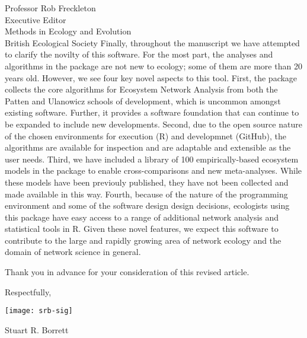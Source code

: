 \documentclass[letter]{letter}
\newcommand{\R}{R}
\begin{document}
\begin{letter}{Professor Rob Freckleton\\
Executive Editor\\
Methods in Ecology and Evolution\\
British Ecological Society
}
Finally, throughout the manuscript we have attempted to clarify the
novilty of this software.  For the most part, the analyses and
algorithms in the package are not new to ecology; some of them are
more than 20 years old.  However, we see four key novel aspects to
this tool.  First, the package collects the core algorithms for
Ecosystem Network Analysis from both the Patten and Ulanowicz schools
of development, which is uncommon amongst existing software.  Further,
it provides a software foundation that can continue to be expanded to
include new developments.  Second, due to the open source nature of
the chosen environments for execution (\R ) and developmnet (GitHub),
the algorithms are available for inspection and are adaptable and
extensible as the user needs.  Third, we have included a library of
100 empirically-based ecosystem models in the package to enable
cross-comparisons and new meta-analyses.  While these models have been
previouly published, they have not been collected and made available
in this way.  Fourth, because of the nature of the programming
environment and some of the software design design decisions,
ecologists using this package have easy access to a range of
additional network analysis and statistical tools in \R .  Given these
novel features, we expect this software to contribute to the large and
rapidly growing area of network ecology and the domain of network
science in general.

Thank you in advance for your consideration of this revised article.  

Respectfully,

\texttt{[image: srb-sig]}

Stuart R. Borrett
\end{letter}
\end{document}
